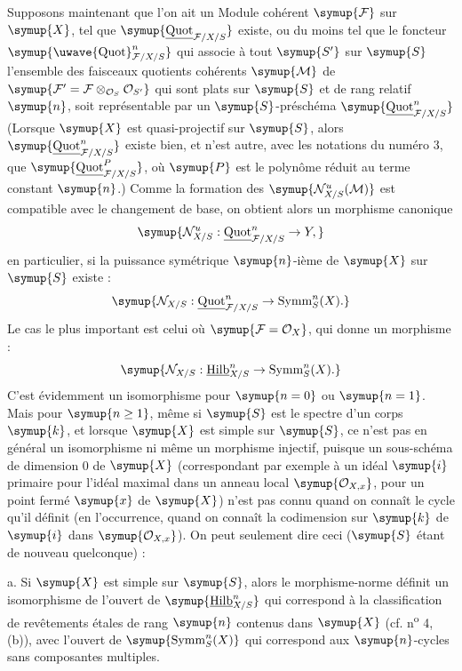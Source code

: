 Supposons maintenant que l'on ait un Module cohérent $\symup{\mathcal F}$ sur $\symup{X}$, tel
que $\symup{\underline{\operatorname{Quot}}_{\mathcal F/X/S}}$ existe, ou du moins tel que le
foncteur $\symup{\mathop{\text{\uwave{Quot}}}\nolimits^n_{\mathcal F/X/S}}$ qui associe à
tout $\symup{S'}$ sur $\symup{S}$ l'ensemble des faisceaux quotients cohérents $\symup{\mathcal M}$ de
$\symup{\mathcal F'=\mathcal F\otimes_{\mathcal O_S}\mathcal O_{S'}}$ qui sont plats
sur $\symup{S}$ et de rang relatif $\symup{n}$, soit représentable par un $\symup{S}$-préschéma
$\symup{\underline{\operatorname{Quot}}^n_{\mathcal F/X/S}}$ (Lorsque $\symup{X}$ est quasi-projectif sur
$\symup{S}$, alors $\symup{\underline{\operatorname{Quot}}^n_{\mathcal F/X/S}}$ existe bien, et n'est
autre, avec les notations du numéro 3, que
$\symup{\underline{\operatorname{Quot}}^P_{\mathcal F/X/S}}$, où $\symup{P}$ est le polynôme réduit au
terme constant $\symup{n}$.) Comme la formation des $\symup{\mathcal N^u_{X/S}(\mathcal M)}$ est
compatible avec le changement de base, on obtient alors un morphisme canonique
\[
\symup{\mathcal N^u_{X/S}:\underline{\operatorname{Quot}}^n_{\mathcal F/X/S}\to Y,}
\]
en particulier, si la puissance symétrique $\symup{n}$-ième de $\symup{X}$ sur $\symup{S}$ existe :
\[
\symup{\mathcal N_{X/S}:\underline{\operatorname{Quot}}^n_{\mathcal F/X/S}\to\operatorname{Symm}^n_S(X).}
\]
Le cas le plus important est celui où $\symup{\mathcal F=\mathcal O_X}$, qui donne un morphisme :
\[
\symup{\mathcal N_{X/S}:\underline{\operatorname{Hilb}}^n_{X/S}
\to\operatorname{Symm}^n_S(X).}
\]
C'est évidemment un isomorphisme pour $\symup{n=0}$ ou $\symup{n=1}$. Mais pour
$\symup{n\geq1}$, même
si $\symup{S}$ est le spectre d'un corps $\symup{k}$, et lorsque $\symup{X}$ est simple sur $\symup{S}$, ce
n'est pas en général un isomorphisme ni même un morphisme injectif, puisque un
sous-schéma de dimension 0 de $\symup{X}$ (correspondant par exemple à un idéal
$\symup{i}$ primaire pour l'idéal maximal dans un anneau local
$\symup{\mathcal O_{X,x}}$, pour un point fermé $\symup{x}$ de $\symup{X}$) n'est pas connu quand on
connaît le cycle qu'il définit (en l'occurrence, quand on connaît la codimension
sur $\symup{k}$ de $\symup{i}$ dans $\symup{\mathcal O_{X,x}}$). On peut seulement dire ceci
($\symup{S}$ étant de nouveau quelconque) :

\medskip
\noindent a. Si $\symup{X}$ est simple sur $\symup{S}$, alors le morphisme-norme définit un
isomorphisme de l'ouvert de $\symup{\underline{\operatorname{Hilb}}^n_{X/S}}$ qui correspond à la
classification de revêtements étales de rang $\symup{n}$ contenus dans $\symup{X}$ (cf.
n\textsuperscript{o} 4, (b)), avec l'ouvert de
$\symup{\operatorname{Symm}^n_S(X)}$ qui correspond aux $\symup{n}$-cycles sans composantes
multiples.

